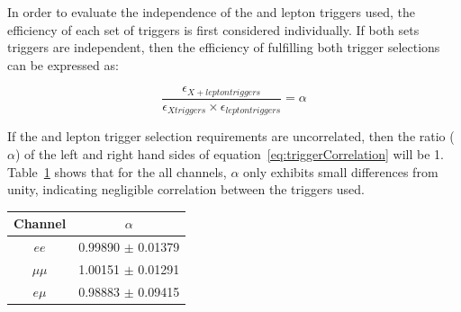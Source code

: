 In order to evaluate the independence of the \MET and lepton triggers used, the efficiency of each set of triggers is first considered individually.
If both sets triggers are independent, then the efficiency of fulfilling both trigger selections can be expressed as:

\begin{equation}
\frac{\epsilon_{X + lepton triggers}}{\epsilon_{X triggers} \times \epsilon_{lepton triggers}} = \alpha
\label{eq:triggerCorrelation}
\end{equation}

If the \MET and lepton trigger selection requirements are uncorrelated, then the ratio ($\alpha$) of the left and right hand sides of equation~\ref{eq:triggerCorrelation} will be 1.
Table~\ref{tab:triggerCorrelation} shows that for the all channels, $\alpha$ only exhibits small differences from unity, indicating negligible correlation between the triggers used.

\begin{table}[htbp]
\label{tab:triggerCorrelation}
  \centering
 \begin{tabular}{cc}
   \hline
   \textbf{Channel} & \textbf{$\alpha$}   \\
   \hline   
   $ee$ & 0.99890 $\pm$ 0.01379\\
   $\mu\mu$ & 1.00151 $\pm$ 0.01291\\
   $e \mu$ & 0.98883 $\pm$ 0.09415\\
   \hline
 \end{tabular}%
\end{table}

%

